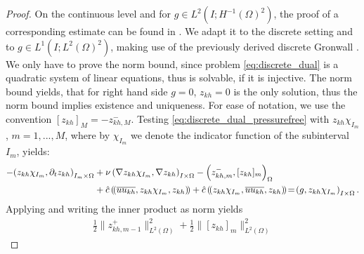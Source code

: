 \documentclass{m2an}
\newcommand\blue[1]{\textcolor{black}{#1}}
\newcommand{\IOprod}[1]{\left( #1 \right)_{I\times\Omega}}
\newcommand{\ImOprod}[1]{\left( #1 \right)_{I_m\times\Omega}}
\newcommand{\Oprod}[1]{\left( #1 \right)_{\Omega}}
\newcommand{\chatIO}[1]{\hat c \left(\!\left( #1 \right)\!\right)}
\newcommand{\uukh}{\overline{uu_{kh}}}
\newcommand{\ukh}{u_{kh}}
\newcommand{\zkh}{z_{kh}}
\newcommand{\dualrhs}{g}
\newcommand{\duallinearizationpoint}{\psi}
\begin{document}
\begin{proof}
  On the continuous level and for $\dualrhs \in L^2(I;H^{-1}(\Omega)^2)$,
  the proof of a corresponding estimate
  can be found in \cite[Proposition 2.7]{casas_well_posedness_2021}.
  We adapt it to the discrete setting and to $\dualrhs \in L^1(I;L^2(\Omega)^2)$,
  making use of the previously derived
  discrete Gronwall .
  We only have to prove the norm bound, since
  problem \eqref{eq:discrete_dual} is a quadratic system of linear equations, thus is solvable, if 
  it is injective. The norm bound yields, that for right hand side $\dualrhs=0$,
  $\zkh=0$ is the only solution,
  thus the norm bound implies existence and uniqueness.
  For ease of notation, we use the convention $[\zkh]_M = -z_{kh,M}^-$.
  Testing \cref{eq:discrete_dual_pressurefree} with $\zkh \chi_{I_{m}}$, $m=1,...,M$,
  where by $\chi_{I_{m}}$ we denote the indicator function of the subinterval $I_{m}$, yields:
  \begin{equation*}
  \begin{aligned}
    - \blue{\ImOprod{\zkh \chi_{I_{m}},\partial_t \zkh}}
    & + \nu\IOprod{\nabla \zkh \chi_{I_{m}}, \nabla \zkh}
    - \Oprod{z_{kh,m}^-,[\zkh]_{m}} \\
                                        & + \chatIO{\uukh,\zkh \chi_{I_{m}},\zkh}
    + \chatIO{\zkh \chi_{I_{m}},\uukh,\zkh}
                                         \! = \! \IOprod{\dualrhs,\zkh \chi_{I_{m}}}.
  \end{aligned}
 \end{equation*}
 Applying  and writing the inner product as norm yields
 \begin{equation}\label{eq:discrete_dual_tested}
  \begin{aligned}
    \frac{1}{2} \|z_{kh,m-1}^+\|_{L^2(\Omega)}^2 + \frac{1}{2} \|[\zkh]_{m}\|_{L^2(\Omega)}^2

\end{aligned}
\end{equation}
\end{proof}
\end{document}
